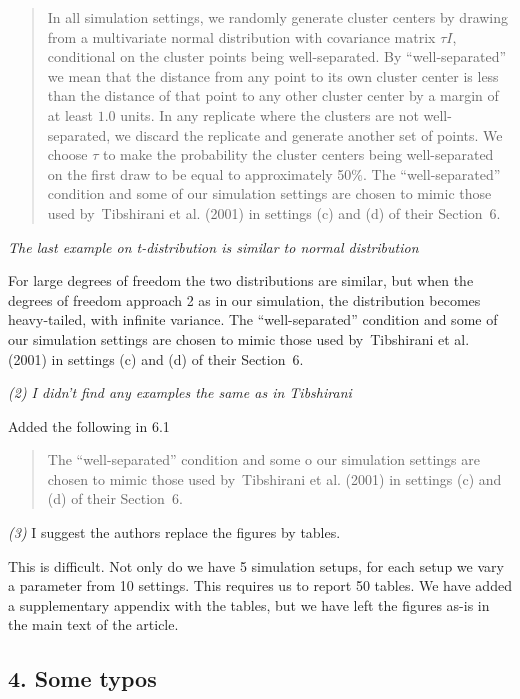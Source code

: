 \documentclass[11pt]{article}
\begin{document}
\begin{quote}
In all simulation settings, we randomly generate cluster centers by drawing
from a multivariate normal distribution with covariance matrix $\tau I$,
conditional on the cluster points being well-separated. By ``well-separated''
we mean that the distance from any point to its own cluster center is less
than the distance of that point to any other cluster center by a margin of at
least $1.0$ units. In any replicate where the clusters are not well-separated,
we discard the replicate and generate another set of points.  We choose $\tau$
to make the probability the cluster centers being well-separated on the first
draw to be equal to approximately 50\%.  The ``well-separated'' condition and
some of our simulation settings are chosen to mimic those used by~Tibshirani
et al. (2001) in settings (c) and (d) of their Section~6.
\end{quote}


\emph{The last example on t-distribution is similar to normal distribution}

For large degrees of freedom the two distributions are similar, but when the
degrees of freedom approach 2 as in our simulation, the distribution becomes
heavy-tailed, with infinite variance.  The ``well-separated'' condition and
some of our simulation settings are chosen to mimic those used by~Tibshirani
et al. (2001) in settings (c) and (d) of their Section~6.



\emph{(2) I didn't find any examples the same as in Tibshirani}

Added the following in 6.1

\begin{quote}
The ``well-separated'' condition and
some o our simulation settings are chosen to mimic those used by~Tibshirani
et al. (2001) in settings (c) and (d) of their Section~6.
\end{quote}

\emph{(3)} I suggest the authors replace the figures by tables.

This is difficult. Not only do we have 5 simulation setups, for each setup we
vary a parameter from 10 settings. This requires us to report 50 tables. We
have added a supplementary appendix with the tables, but we have left the
figures as-is in the main text of the article.


\subsection{4. Some typos}
\end{document}
